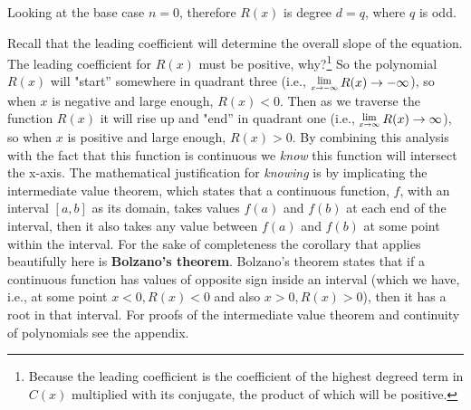 \documentclass[12pt]{article}
\newcommand{\Lim}[1]{\raisebox{0.5ex}{\scalebox{0.8}{$\displaystyle \lim_{#1}\;$}}}
\begin{document}
Looking at the base case $n=0$, therefore $R(x)$ is degree $d=q$, where $q$ is odd. 

\begin{wrapfigure}{r}{4cm}
\end{wrapfigure}

Recall that the leading coefficient will determine the overall slope of the equation.  The leading coefficient for $R(x)$ must be positive, why?\footnote{Because the leading coefficient is the coefficient of the highest degreed term in $C(x)$ multiplied with its conjugate, the product of which will be positive.}  So the polynomial $R(x)$ will "start'' somewhere in quadrant three (i.e., $\Lim{x \rightarrow -\infty} R(x) \rightarrow -\infty$), so when $x$ is negative and large enough, $R(x)<0$.  Then as we traverse the function $R(x)$ it will rise up and "end'' in quadrant one (i.e., $\Lim{x \rightarrow \infty} R(x) \rightarrow \infty$), so when $x$ is positive and large enough, $R(x)>0$.  By combining this analysis with the fact that this function is continuous we \emph{know} this function will intersect the x-axis.  The mathematical justification for \emph{knowing} is by implicating the intermediate value theorem, which states that a continuous function, $f$, with an interval $[a,b]$ as its domain, takes values $f(a)$ and $f(b)$ at each end of the interval, then it also takes any value between $f(a)$ and $f(b)$ at some point within the interval.  For the sake of completeness the corollary that applies beautifully here is \textbf{Bolzano's theorem}.  Bolzano's theorem states that if a continuous function has values of opposite sign inside an interval (which we have, i.e., at some point $x<0, R(x)<0$ and also $x>0, R(x)>0$), then it has a root in that interval.  For proofs of the intermediate value theorem and continuity of polynomials see the appendix.\\
\end{document}
